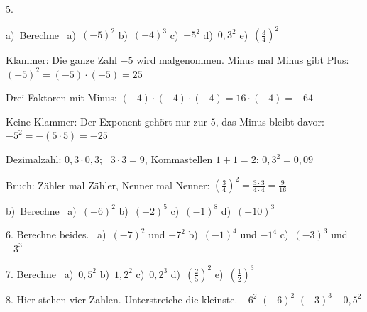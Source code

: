 \documentclass[11pt]{article}
\newcommand{\grau}[1]{{\color{mbgrau}#1}}
\begin{document}
\begin{pfaufg}{}{5.}{}
\grau{a)\ Berechne \ a)~$(-5)^2$ \qquad b)~$(-4)^3$ \qquad c)~$-5^2$ \qquad d)~$0{,}3^2$ \qquad e)~$\left(\frac{3}{4}\right)^2$\par\smallskip Klammer: Die ganze Zahl $-5$ wird malgenommen. Minus mal Minus gibt Plus: \quad $(-5)^2 = (-5) \cdot (-5) = 25$\par Drei Faktoren mit Minus: \quad $(-4) \cdot (-4) \cdot (-4) = 16 \cdot (-4) = -64$\par Keine Klammer: Der Exponent gehört nur zur $5$, das Minus bleibt davor: \quad $-5^2 = -(5 \cdot 5) = -25$\par Dezimalzahl: \quad $0{,}3 \cdot 0{,}3$; \ $3 \cdot 3 = 9$, Kommastellen $1 + 1 = 2$: \quad $0{,}3^2 = 0{,}09$\par Bruch: Zähler mal Zähler, Nenner mal Nenner: \quad $\left(\frac{3}{4}\right)^2 = \frac{3 \cdot 3}{4 \cdot 4} = \frac{9}{16}$}
\par\medskip
b)\ Berechne \ a)~$(-6)^2$ \qquad b)~$(-2)^5$ \qquad c)~$(-1)^8$ \qquad d)~$(-10)^3$
\end{pfaufg}

\begin{pfaufg}{}{6.}{}
Berechne beides. \ a)~$(-7)^2$ und $-7^2$ \qquad b)~$(-1)^4$ und $-1^4$ \qquad c)~$(-3)^3$ und $-3^3$
\end{pfaufg}

\begin{pfaufg}{}{7.}{}
Berechne \ a)~$0{,}5^2$ \qquad b)~$1{,}2^2$ \qquad c)~$0{,}2^3$ \qquad d)~$\left(\frac{2}{5}\right)^2$ \qquad e)~$\left(\frac{1}{2}\right)^3$
\end{pfaufg}

\begin{pfaufg}{}{8.}{}
Hier stehen vier Zahlen. Unterstreiche die kleinste. \quad $-6^2$ \qquad $(-6)^2$ \qquad $(-3)^3$ \qquad $-0{,}5^2$
\end{pfaufg}
\end{document}
